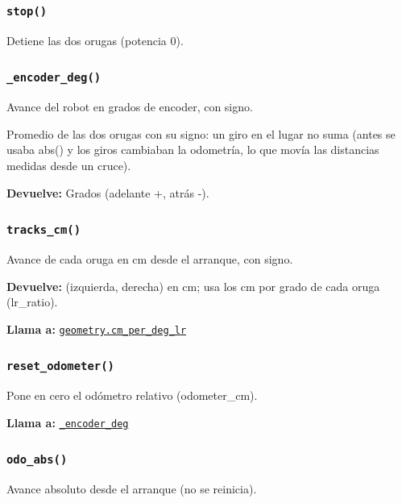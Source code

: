 \subsubsection{\texttt{stop()}}\label{fn:hal:stop}
\noindent Detiene las dos orugas (potencia 0).


\subsubsection{\texttt{\_\allowbreak{}encoder\_\allowbreak{}deg()}}\label{fn:hal:-encoder-deg}
\noindent Avance del robot en grados de encoder, con signo.

Promedio de las dos orugas con su signo: un giro en el lugar no suma (antes se usaba abs() y los giros cambiaban la odometría, lo que movía las distancias medidas desde un cruce).

\noindent\textbf{Devuelve:} Grados (adelante +, atrás -).\par

\subsubsection{\texttt{tracks\_\allowbreak{}cm()}}\label{fn:hal:tracks-cm}
\noindent Avance de cada oruga en cm desde el arranque, con signo.

\noindent\textbf{Devuelve:} (izquierda, derecha) en cm; usa los cm por grado de cada oruga (lr\_ratio).\par
\noindent\textbf{Llama a:} \hyperref[fn:geometry:cm-per-deg-lr]{\texttt{geometry.cm\_\allowbreak{}per\_\allowbreak{}deg\_\allowbreak{}lr}}\par

\subsubsection{\texttt{reset\_\allowbreak{}odometer()}}\label{fn:hal:reset-odometer}
\noindent Pone en cero el odómetro relativo (odometer\_cm).

\noindent\textbf{Llama a:} \hyperref[fn:hal:-encoder-deg]{\texttt{\_\allowbreak{}encoder\_\allowbreak{}deg}}\par

\subsubsection{\texttt{odo\_\allowbreak{}abs()}}\label{fn:hal:odo-abs}
\noindent Avance absoluto desde el arranque (no se reinicia).

